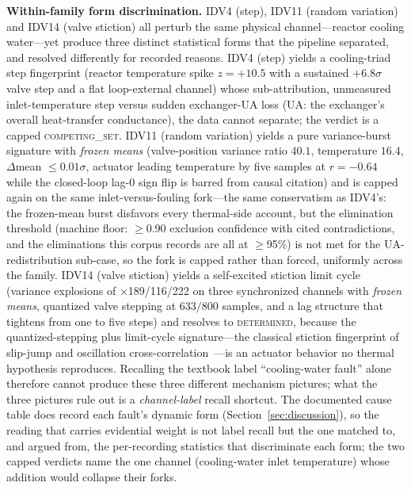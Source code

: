\documentclass[preprint,10pt]{elsarticle}
\begin{document}
\textbf{Within-family form discrimination.} IDV4 (step), IDV11 (random variation) and IDV14 (valve stiction) all perturb the same physical channel---reactor cooling water---yet produce three distinct statistical forms that the pipeline separated, and resolved differently for recorded reasons. IDV4 (step) yields a cooling-triad step fingerprint (reactor temperature spike $z{=}{+}10.5$ with a sustained $+6.8\sigma$ valve step and a flat loop-external channel) whose sub-attribution, unmeasured inlet-temperature step versus sudden exchanger-UA loss (UA: the exchanger's overall heat-transfer conductance), the data cannot separate; the verdict is a capped \mbox{\textsc{competing\_set}}. IDV11 (random variation) yields a pure variance-burst signature with \emph{frozen means} (valve-position variance ratio $40.1$, temperature $16.4$, $\Delta$mean $\le 0.01\sigma$, actuator leading temperature by five samples at $r{=}{-}0.64$ while the closed-loop lag-0 sign flip is barred from causal citation) and is capped again on the same inlet-versus-fouling fork---the same conservatism as IDV4's: the frozen-mean burst disfavors every thermal-side account, but the elimination threshold (machine floor: $\ge$0.90 exclusion confidence with cited contradictions, and the eliminations this corpus records are all at $\ge$95\%) is not met for the UA-redistribution sub-case, so the fork is capped rather than forced, uniformly across the family. IDV14 (valve stiction) yields a self-excited stiction limit cycle (variance explosions of $\times$189/116/222 on three synchronized channels with \emph{frozen means}, quantized valve stepping at $633/800$ samples, and a lag structure that tightens from one to five steps) and resolves to \mbox{\textsc{determined}}, because the quantized-stepping plus limit-cycle signature---the classical stiction fingerprint of slip-jump and oscillation cross-correlation~\cite{horch1999simple,hagglund1995control,choudhury2008diagnosis}---is an actuator behavior no thermal hypothesis reproduces. Recalling the textbook label ``cooling-water fault'' alone therefore cannot produce these three different mechanism pictures; what the three pictures rule out is a \emph{channel-label} recall shortcut. The documented cause table does record each fault's dynamic form (Section~\ref{sec:discussion}), so the reading that carries evidential weight is not label recall but the one matched to, and argued from, the per-recording statistics that discriminate each form; the two capped verdicts name the one channel (cooling-water inlet temperature) whose addition would collapse their forks.
\end{document}
